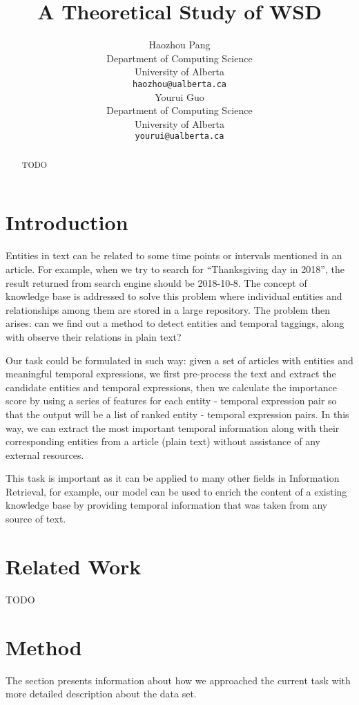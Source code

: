 \documentclass[11pt,a4paper]{article}
\title{A Theoretical Study of WSD}
\author{Haozhou Pang \\
  Department of Computing Science \\
  University of Alberta\\
  {\tt haozhou@ualberta.ca} \\\And
 Yourui Guo\\
  Department of Computing Science \\
  University of Alberta\\
  {\tt yourui@ualberta.ca} \\}
\date{}
\begin{document}
\maketitle

\begin{abstract}
TODO

\end{abstract}


\section{Introduction}
  
Entities in text can be related to some time points or intervals mentioned in an article. For example, when we try to search for “Thanksgiving day in 2018”, the result returned from search engine should be 2018-10-8. The concept of knowledge base is addressed to solve this problem where individual entities and relationships among them are stored in a large repository. The problem then arises: can we find out a method to detect entities and temporal taggings, along with observe their relations in plain text? 

Our task could be formulated in such way: given a set of articles with entities and meaningful temporal expressions, we first pre-process the text and extract the candidate entities and temporal expressions, then we calculate the importance score by using a series of features for each entity - temporal expression pair so that the output will be a list of ranked entity - temporal expression pairs. In this way, we can extract the most important temporal information along with their corresponding entities from a article (plain text) without assistance of any external resources.

This task is important as it can be applied to many other fields in Information Retrieval, for example, our model can be used to enrich the content of a existing knowledge base by providing temporal information that was taken from any source of text. 


\section{Related Work}
TODO

\section{Method}
The section presents information about how we approached the current task with more detailed description about the data set. 
\end{document}
